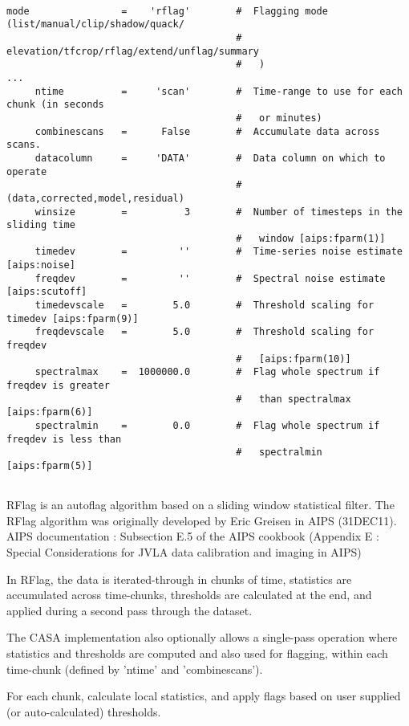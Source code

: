 \small
\begin{verbatim}

mode                =    'rflag'        #  Flagging mode (list/manual/clip/shadow/quack/
                                        #   elevation/tfcrop/rflag/extend/unflag/summary
                                        #   )
...
     ntime          =     'scan'        #  Time-range to use for each chunk (in seconds
                                        #   or minutes)
     combinescans   =      False        #  Accumulate data across scans.
     datacolumn     =     'DATA'        #  Data column on which to operate
                                        #   (data,corrected,model,residual)
     winsize        =          3        #  Number of timesteps in the sliding time
                                        #   window [aips:fparm(1)]
     timedev        =         ''        #  Time-series noise estimate [aips:noise]
     freqdev        =         ''        #  Spectral noise estimate [aips:scutoff]
     timedevscale   =        5.0        #  Threshold scaling for timedev [aips:fparm(9)]
     freqdevscale   =        5.0        #  Threshold scaling for freqdev
                                        #   [aips:fparm(10)]
     spectralmax    =  1000000.0        #  Flag whole spectrum if freqdev is greater
                                        #   than spectralmax [aips:fparm(6)]
     spectralmin    =        0.0        #  Flag whole spectrum if freqdev is less than
                                        #   spectralmin [aips:fparm(5)]
                                       
\end{verbatim}
\normalsize

RFlag is an autoflag algorithm based on a sliding window statistical
filter. The RFlag algorithm was originally developed by Eric Greisen
in AIPS (31DEC11).  AIPS documentation : Subsection E.5 of the AIPS
cookbook (Appendix E : Special Considerations for JVLA data
calibration and imaging in AIPS)

In RFlag, the data is iterated-through in chunks of time, statistics
are accumulated across time-chunks, thresholds are calculated at the
end, and applied during a second pass through the dataset.

The CASA implementation also optionally allows a single-pass operation
where statistics and thresholds are computed and also used for
flagging, within each time-chunk (defined by 'ntime' and
'combinescans').

For each chunk, calculate local statistics, and apply flags based on
user supplied (or auto-calculated) thresholds.

